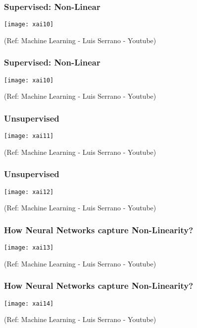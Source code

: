 \begin{frame}[fragile]\frametitle{Supervised: Non-Linear}
\begin{center}
\texttt{[image: xai10]}
\end{center}

\tiny{(Ref: Machine Learning - Luis Serrano - Youtube)}
\end{frame}

\begin{frame}[fragile]\frametitle{Supervised: Non-Linear}
\begin{center}
\texttt{[image: xai10]}
\end{center}

\tiny{(Ref: Machine Learning - Luis Serrano - Youtube)}
\end{frame}

\begin{frame}[fragile]\frametitle{Unsupervised}
\begin{center}
\texttt{[image: xai11]}
\end{center}

\tiny{(Ref: Machine Learning - Luis Serrano - Youtube)}
\end{frame}

\begin{frame}[fragile]\frametitle{Unsupervised}
\begin{center}
\texttt{[image: xai12]}
\end{center}

\tiny{(Ref: Machine Learning - Luis Serrano - Youtube)}
\end{frame}

\begin{frame}[fragile]\frametitle{How Neural Networks capture Non-Linearity?}
\begin{center}
\texttt{[image: xai13]}
\end{center}

\tiny{(Ref: Machine Learning - Luis Serrano - Youtube)}
\end{frame}

\begin{frame}[fragile]\frametitle{How Neural Networks capture Non-Linearity?}
\begin{center}
\texttt{[image: xai14]}
\end{center}

\tiny{(Ref: Machine Learning - Luis Serrano - Youtube)}
\end{frame}

